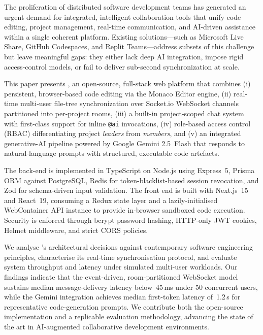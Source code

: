 The proliferation of distributed software development teams has generated an
urgent demand for integrated, intelligent collaboration tools that unify code
editing, project management, real-time communication, and AI-driven assistance
within a single coherent platform. Existing solutions---such as Microsoft Live
Share, GitHub Codespaces, and Replit Teams---address subsets of this challenge
but leave meaningful gaps: they either lack deep AI integration, impose rigid
access-control models, or fail to deliver sub-second synchronization at scale.

This paper presents \echoray, an open-source, full-stack web platform that
combines (i) persistent, browser-based code editing via the Monaco Editor
engine, (ii) real-time multi-user file-tree synchronization over Socket.io
WebSocket channels partitioned into per-project rooms, (iii) a built-in
project-scoped chat system with first-class support for inline \texttt{@ai}
invocations, (iv) role-based access control (RBAC) differentiating project
\emph{leaders} from \emph{members}, and (v) an integrated generative-AI
pipeline powered by Google Gemini 2.5~Flash that responds to natural-language
prompts with structured, executable code artefacts.

The back-end is implemented in TypeScript on Node.js using Express~5, Prisma
ORM against PostgreSQL, Redis for token-blacklist-based session revocation, and
Zod for schema-driven input validation. The front end is built with Next.js~15
and React~19, consuming a Redux state layer and a lazily-initialised
WebContainer API instance to provide in-browser sandboxed code execution.
Security is enforced through bcrypt password hashing, HTTP-only JWT cookies,
Helmet middleware, and strict CORS policies.

We analyse \echoray's architectural decisions against contemporary software
engineering principles, characterise its real-time synchronisation protocol,
and evaluate system throughput and latency under simulated multi-user workloads.
Our findings indicate that the event-driven, room-partitioned WebSocket model
sustains median message-delivery latency below~45\,ms under 50 concurrent users,
while the Gemini integration achieves median first-token latency of~1.2\,s for
representative code-generation prompts. We contribute both the open-source
implementation and a replicable evaluation methodology, advancing the state of
the art in AI-augmented collaborative development environments.
